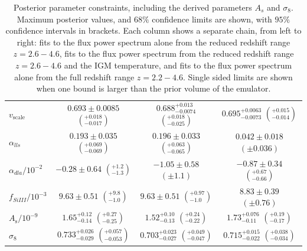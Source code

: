 \begin{table}
\begin{tabular} {| l | c | c | c|}
$v_\mathrm{scale}$ & $0.693\pm 0.0085$  $\left(^{+0.018}_{-0.017}\right)$    & $0.688^{+0.013}_{-0.0074}$  $\left(^{+0.018}_{-0.025}\right)$    & $0.695^{+0.0063}_{-0.0073}$  $\left(^{+0.015}_{-0.014} \right)$     \\
$\alpha_{lls}   $ & $0.193\pm 0.035$ $\left(^{+0.069}_{-0.069}\right)$          & $0.196\pm 0.033$  $\left(^{+0.063}_{-0.065}\right)   $     & $0.042\pm 0.018$  $\left(\pm 0.036\right)$   \\
$\alpha_{dla}/10^{-2}   $ & $-0.28\pm 0.64$ $\left(^{+1.2}_{-1.3}\right)$ & $-1.05\pm 0.58$ $\left(\pm 1.1\right)  $    & $-0.87\pm 0.34         $   $\left(^{+0.67}_{-0.66}\right)$  \\
$f_{SiIII}/10^{-3} $ & $9.63\pm 0.51$ $\left(^{+9.8}_{-1.0}\right)$              & $9.63\pm 0.51        $       $\left(^{+0.97}_{-1.0}\right) $          & $8.83\pm 0.39        $  $\left(\pm 0.76\right)$\\
\hline
$A_\mathrm{s}/10^{-9}      $ & $1.65^{+0.12}_{-0.14}$ $\left(^{+0.27}_{-0.25}\right)$ & $1.52^{+0.10}_{-0.13}$ $\left(^{+0.24}_{-0.22}\right)$  & $1.73^{+0.076}_{-0.11}$ $\left(^{+0.19}_{-0.17}\right)$   \\
$\sigma_8$ & $0.733^{+0.026}_{-0.029}$ $\left(^{+0.057}_{-0.053}\right)$ &  $0.703^{+0.023}_{-0.027}   $ $\left(^{+0.049}_{-0.047}\right)$ & $0.715^{+0.015}_{-0.022}$  $\left(^{+0.038}_{-0.034}\right)$  \\
\hline
\end{tabular}
\caption{\label{table:parameters}
Posterior parameter constraints, including the derived parameters $A_s$ and $\sigma_8$.
Maximum posterior values, and $68\%$ confidence limits are shown, with $95\%$ confidence intervals in brackets.
Each column shows a separate chain, from left to right: fits to the flux power spectrum alone from the reduced redshift range $z=2.6 - 4.6$, fits to the flux power spectrum from the reduced redshift range $z=2.6 - 4.6$ and the IGM temperature, and fits to the flux power spectrum alone from the full redshift range $z=2.2 - 4.6$.
Single sided limits are shown when one bound is larger than the prior volume of the emulator.
}
\end{table}


